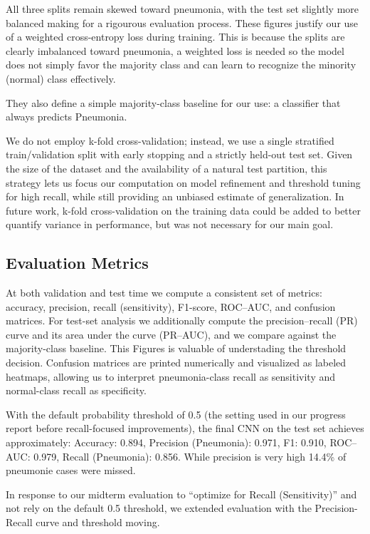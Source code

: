 \documentclass[11pt]{article}
\begin{document}
All three splits remain skewed toward pneumonia, with the test set slightly more balanced making for a rigourous evaluation process. 
These figures justify our use of a weighted cross-entropy loss during training.
This is because the splits are clearly imbalanced toward pneumonia, a weighted loss is needed so the model does not
 simply favor the majority class and can learn to recognize the minority (normal) class effectively.

They also define a simple majority-class baseline for our use: a classifier that always predicts Pneumonia.

We do not employ k-fold cross-validation; instead, we use a single stratified train/validation
 split with early stopping and a strictly held-out test set. 
Given the size of the dataset and the availability of a natural test partition, 
this strategy lets us focus our computation on model refinement and threshold tuning for high recall,
 while still providing an unbiased estimate of generalization. In future work, k-fold cross-validation
  on the training data could be added to better quantify variance in performance, but was not necessary for our main goal.


\subsection{Evaluation Metrics}

At both validation and test time we compute a consistent set of metrics: accuracy, precision, recall (sensitivity),
 F1-score, ROC–AUC, and confusion matrices. For test-set analysis we additionally compute the precision–recall (PR) curve
  and its area under the curve (PR–AUC), and we compare against the majority-class baseline. This Figures is valuable of understading
  the threshold decision. Confusion matrices are printed numerically and visualized as labeled heatmaps, allowing us
   to interpret pneumonia-class recall as sensitivity and normal-class recall as specificity.

With the default probability threshold of 0.5 (the setting used in our progress report before recall-focused improvements), the final CNN on the test set achieves approximately:
Accuracy: 0.894, Precision (Pneumonia): 0.971, F1: 0.910, ROC–AUC: 0.979, Recall (Pneumonia): 0.856. While precision is very high 14.4\% of pneumonie cases were missed.

In response to our midterm evaluation to “optimize for Recall (Sensitivity)” and not rely on the default 0.5 threshold, we extended evaluation with the Precision-Recall curve and threshold moving. 
\end{document}
